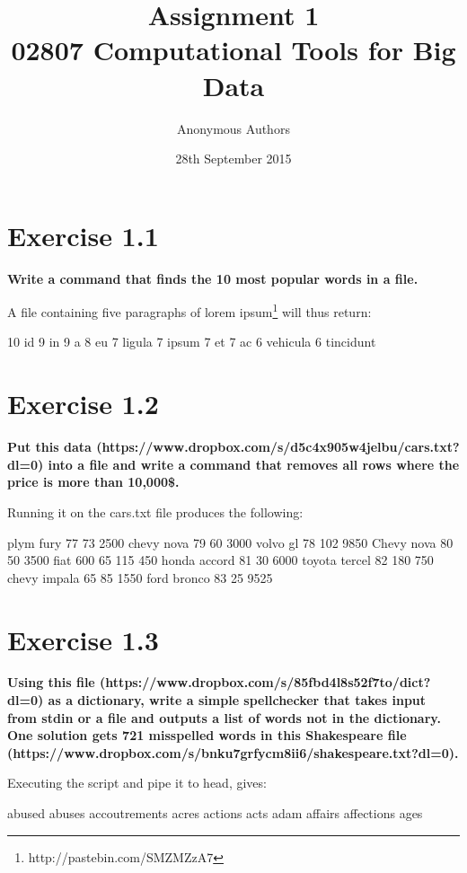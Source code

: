 \documentclass{article}
\title{Assignment 1\\02807 Computational Tools for Big Data}
\author{Anonymous Authors}
\date{28th September 2015}
\begin{document}
\maketitle
\newpage
\section{Exercise 1.1}
\textbf{Write a command that finds the 10 most popular words in a file.}


A file containing five paragraphs of lorem ipsum\footnote{http://pastebin.com/SMZMZzA7} will thus return:
\begin{pythonOutput}
     10 id
      9 in
      9 a
      8 eu
      7 ligula
      7 ipsum
      7 et
      7 ac
      6 vehicula
      6 tincidunt
\end{pythonOutput}
\section{Exercise 1.2}
\textbf{Put this data (https://www.dropbox.com/s/d5c4x905w4jelbu/cars.txt?dl=0) into a file and write a command that removes all rows where the price is more than 10,000\$.}

Running it on the cars.txt file produces the following:
\begin{pythonOutput}
plym    fury    77      73      2500
chevy   nova    79      60      3000
volvo   gl      78      102     9850
Chevy   nova    80      50      3500
fiat    600     65      115     450
honda   accord  81      30      6000
toyota  tercel  82      180     750
chevy   impala  65      85      1550
ford    bronco  83      25      9525
\end{pythonOutput}


\section{Exercise 1.3}
\textbf{Using this file (https://www.dropbox.com/s/85fbd4l8s52f7to/dict?dl=0) as a dictionary, write a simple spellchecker that takes input from stdin or a file and outputs a list of words not in the dictionary. One solution gets 721 misspelled words in this Shakespeare file (https://www.dropbox.com/s/bnku7grfycm8ii6/shakespeare.txt?dl=0).}

Executing the script and pipe it to head, gives:
\begin{pythonOutput}
abused
abuses
accoutrements
acres
actions
acts
adam
affairs
affections
ages
\end{pythonOutput}
\end{document}
